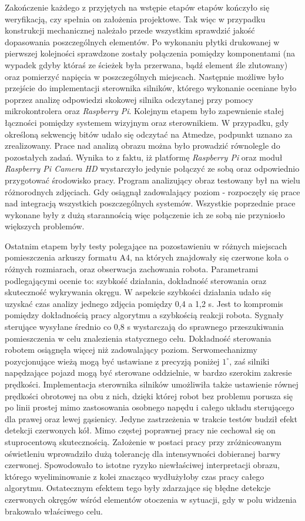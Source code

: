Zakończenie każdego z przyjętych na wstępie etapów etapów kończyło się weryfikacją, czy spełnia on założenia projektowe. Tak więc w przypadku konstrukcji mechanicznej należało przede wszystkim sprawdzić jakość dopasowania poszczególnych elementów. Po wykonaniu płytki drukowanej w pierwszej kolejności sprawdzone zostały połączenia pomiędzy komponentami (na wypadek gdyby któraś ze ścieżek była przerwana, bądź element źle zlutowany) oraz pomierzyć napięcia w poszczególnych miejscach. Następnie możliwe było przejście do implementacji sterownika silników, którego wykonanie oceniane było poprzez analizę odpowiedzi skokowej silnika odczytanej przy pomocy mikrokontrolera oraz \textit{Raspberry Pi}. Kolejnym etapem było zapewnienie stałej łączności pomiędzy systemem wizyjnym oraz sterownikiem. W przypadku, gdy określoną sekwencję bitów udało się odczytać na Atmedze, podpunkt uznano za zrealizowany. Prace nad analizą obrazu można było prowadzić równolegle do pozostałych zadań. Wynika to z faktu, iż platformę \textit{Raspberry Pi} oraz moduł \textit{Raspberry Pi Camera HD} wystarczyło jedynie połączyć ze sobą oraz odpowiednio przygotować środowisko pracy. Program analizujący obraz testowany był na wielu różnorodnych zdjęciach. Gdy osiągnął zadowalający poziom - rozpoczęły się prace nad integracją wszystkich poszczególnych systemów. Wszystkie poprzednie prace wykonane były z dużą starannością więc połączenie ich ze sobą nie przyniosło większych problemów.

Ostatnim etapem były testy polegające na pozostawieniu w różnych miejscach pomieszczenia arkuszy formatu A4, na których znajdowały się czerwone koła o różnych rozmiarach, oraz obserwacja zachowania robota. Parametrami podlegającymi ocenie to: szybkość działania, dokładność sterowania oraz skuteczność wykrywania okręgu. W aspekcie szybkości działania udało się uzyskać czas analizy jednego zdjęcia pomiędzy 0,4 a 1,2 s. Jest to kompromis pomiędzy dokładnością pracy algorytmu a szybkością reakcji robota. Sygnały sterujące wysyłane średnio co 0,8 s wystarczają do sprawnego przeszukiwania pomieszczenia w celu znalezienia statycznego celu. Dokładność sterowania robotem osiągnęła więcej niż zadowalający poziom. Serwomechanizmy pozycjonujące wieżą mogą być ustawiane z precyzją poniżej $1^\circ$, zaś silniki napędzające pojazd mogą być sterowane oddzielnie, w bardzo szerokim zakresie prędkości. Implementacja sterownika silników umożliwiła także ustawienie równej prędkości obrotowej na obu z nich, dzięki której robot bez problemu porusza się po linii prostej mimo zastosowania osobnego napędu i całego układu sterującego dla prawej oraz lewej gąsienicy. Jedyne zastrzeżenia w trakcie testów budził efekt detekcji czerwonych kół. Mimo częstej poprawnej pracy nie cechował się on stuprocentową skutecznością. Założenie w postaci pracy przy zróżnicowanym oświetleniu wprowadziło dużą tolerancję dla intensywności dobieranej barwy czerwonej. Spowodowało to istotne ryzyko niewłaściwej interpretacji obrazu, którego wyeliminowanie z kolei znacząco wydłużyłoby czas pracy całego algorytmu. Ostatecznym efektem tego były zdarzające się błędne detekcje czerwonych okręgów wśród elementów otoczenia w sytuacji, gdy w polu widzenia brakowało właściwego celu.

